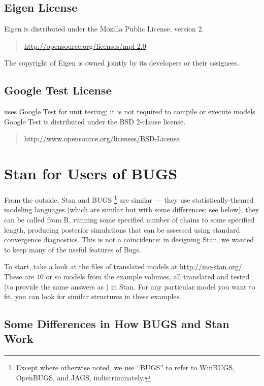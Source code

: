 \section{Eigen License} 
%
Eigen is distributed under the Mozilla Public License,
version 2.
%
\begin{quote}
\url{http://opensource.org/licenses/mpl-2.0}
\end{quote}
%
The copyright of Eigen is owned jointly by its developers or their
assignees. 

\section{Google Test License}

\Stan uses Google Test for unit testing; it is not required to compile
or execute models.  Google Test is distributed under the BSD 2-clause
license.
%
\begin{quote}
\url{http://www.opensource.org/licenses/BSD-License}
\end{quote}


\chapter{Stan for Users of BUGS}\label{stan-for-bugs.appendix}

From the outside, Stan and BUGS%
%
\footnote{Except where otherwise noted, we use ``BUGS'' to refer to
  WinBUGS, OpenBUGS, and JAGS, indiscriminately.}
%
are similar --- they use statistically-themed modeling languages
(which are similar but with some differences; see below), they can be
called from R, running some specified number of chains to some
specified length, producing posterior simulations that can be assessed
using standard convergence diagnostics.  This is not a coincidence:
in designing Stan, we wanted to keep many of the useful features of
Bugs.

To start, take a look at the files of translated \BUGS models at
\url{http://mc-stan.org/}.  These are 40 or so models from the \BUGS
example volumes, all translated and tested (to provide the same
answers as \BUGS) in Stan.  For any particular model you want to fit,
you can look for similar structures in these examples.

\section{Some Differences in How BUGS and Stan Work}

